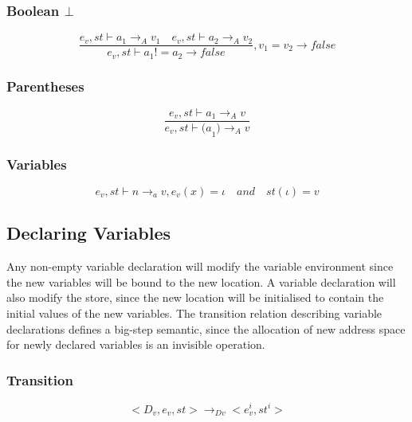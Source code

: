 \subsubsection{Boolean $\bot$}
\begin{equation}
	\frac { { e }_{ v },st\vdash { a }_{ 1 }{ \rightarrow  }_{ A }{ v }_{ 1 }\quad { e }_{ v },st\vdash { a }_{ 2 }{ \rightarrow  }_{ A }{ v }_{ 2 } }{ { e }_{ v },st\vdash { a }_{ 1 }!={ a }_{ 2 }{ \rightarrow  }false } ,{ v }_{ 1 }={ v }_{ 2 }\rightarrow false
\end{equation}


\subsubsection{Parentheses}
\begin{equation}
	\frac { { e }_{ v },st\vdash { a }_{ 1 }{ \rightarrow  }_{ A }{ v } }{ { e }_{ v },st\vdash { (a }_{ 1 }){ \rightarrow  }_{ A }{ v } }
\end{equation}


\subsubsection{Variables}
\begin{equation}
	{ e }_{ v },st\vdash n{ \rightarrow  }_{ a }v, { e }_{ v }(x)=\iota\quad and\quad st(\iota )=v
\end{equation}


\subsection*{Declaring Variables}
Any non-empty variable declaration will modify the variable environment since the new variables will be bound to the new location.
A variable declaration will also modify the store, since the new location will be initialised to contain the initial values of the new variables.
The transition relation describing variable declarations defines a big-step semantic, since the allocation of new address space for newly declared variables is an invisible operation.

\subsubsection{Transition}
\begin{equation}
<{ D }_{ v },{ e }_{ v },st>{ \rightarrow  }_{ Dv }<{ e }_{ v }^{ i },{ st }^{ i }>
\end{equation}


